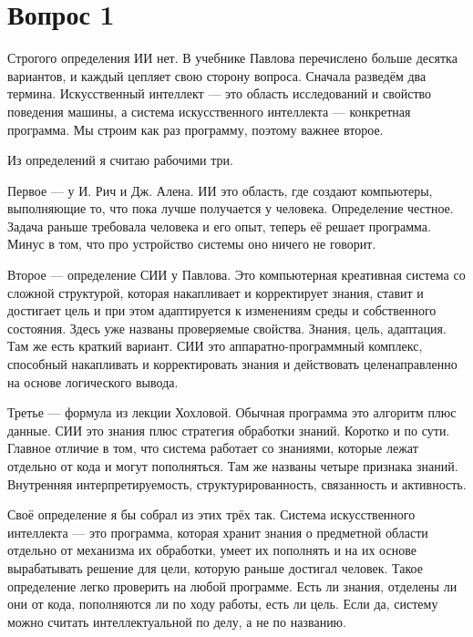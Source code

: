 \section*{Вопрос 1}

Строгого определения ИИ нет. В учебнике Павлова перечислено больше десятка вариантов, и каждый цепляет свою сторону вопроса. Сначала разведём два термина. Искусственный интеллект --- это область исследований и свойство поведения машины, а система искусственного интеллекта --- конкретная программа. Мы строим как раз программу, поэтому важнее второе.

Из определений я считаю рабочими три.

Первое --- у И. Рич и Дж. Алена. ИИ это область, где создают компьютеры, выполняющие то, что пока лучше получается у человека. Определение честное. Задача раньше требовала человека и его опыт, теперь её решает программа. Минус в том, что про устройство системы оно ничего не говорит.

Второе --- определение СИИ у Павлова. Это компьютерная креативная система со сложной структурой, которая накапливает и корректирует знания, ставит и достигает цель и при этом адаптируется к изменениям среды и собственного состояния. Здесь уже названы проверяемые свойства. Знания, цель, адаптация. Там же есть краткий вариант. СИИ это аппаратно-программный комплекс, способный накапливать и корректировать знания и действовать целенаправленно на основе логического вывода.

Третье --- формула из лекции Хохловой. Обычная программа это алгоритм плюс данные. СИИ это знания плюс стратегия обработки знаний. Коротко и по сути. Главное отличие в том, что система работает со знаниями, которые лежат отдельно от кода и могут пополняться. Там же названы четыре признака знаний. Внутренняя интерпретируемость, структурированность, связанность и активность.

Своё определение я бы собрал из этих трёх так. Система искусственного интеллекта --- это программа, которая хранит знания о предметной области отдельно от механизма их обработки, умеет их пополнять и на их основе вырабатывать решение для цели, которую раньше достигал человек. Такое определение легко проверить на любой программе. Есть ли знания, отделены ли они от кода, пополняются ли по ходу работы, есть ли цель. Если да, систему можно считать интеллектуальной по делу, а не по названию.
